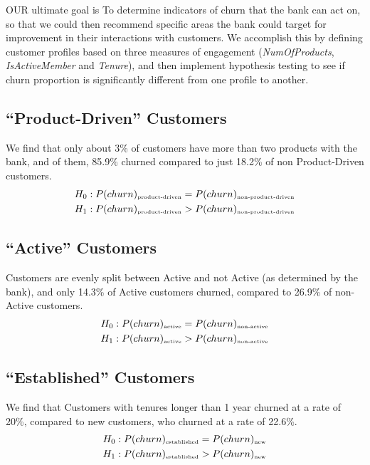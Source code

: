\documentclass[twoside,twocolumn]{article}
\begin{document}
\lettrine[nindent=0em,lines=2]{O}UR ultimate goal is To determine indicators of churn that the bank can act on, so that we could then recommend specific areas the bank could target for improvement in their interactions with customers. We accomplish this by defining customer profiles based on three measures of engagement (\textit{NumOfProducts}, \textit{IsActiveMember} and \textit{Tenure}), and then implement hypothesis testing to see if churn proportion is significantly different from one profile to another.

\subsection{``Product-Driven'' Customers}
We find that only about 3\% of customers have more than two products with the bank, and of them, 85.9\% churned compared to just 18.2\% of non Product-Driven customers.
\begin{align*}
  H_0: P(churn)_{\text{\tiny{product-driven}}} &= P(churn)_{\text{\tiny{non-product-driven}}}\\
  H_1: P(churn)_{\text{\tiny{product-driven}}} &> P(churn)_{\text{\tiny{non-product-driven}}}
\end{align*}

\subsection{``Active'' Customers}
Customers are evenly split between Active and not Active (as determined by the bank), and only 14.3\% of Active customers churned, compared to 26.9\% of non-Active customers.
\begin{align*}
  H_0: P(churn)_{\text{\tiny{active}}} &= P(churn)_{\text{\tiny{non-active}}}\\
  H_1: P(churn)_{\text{\tiny{active}}} &> P(churn)_{\text{\tiny{non-active}}}
\end{align*}

\subsection{``Established'' Customers}
We find that Customers with tenures longer than 1 year churned at a rate of 20\%, compared to new customers, who churned at a rate of 22.6\%.
\begin{align*}
  H_0: P(churn)_{\text{\tiny{established}}} &= P(churn)_{\text{\tiny{new}}}\\
  H_1: P(churn)_{\text{\tiny{established}}} &> P(churn)_{\text{\tiny{new}}}
\end{align*}
\end{document}
